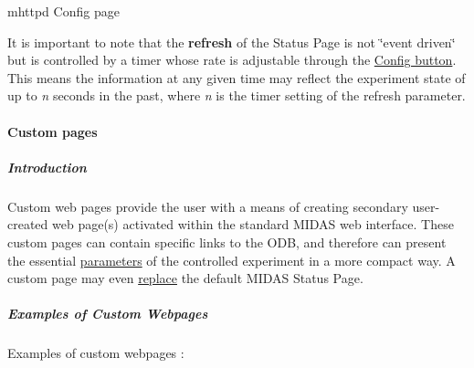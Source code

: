 \begin{center} mhttpd Config page \par
  \end{center} 

It is important to note that the {\bfseries refresh} of the Status Page is not \char`\"{}event driven\char`\"{} but is controlled by a timer whose rate is adjustable through the \hyperlink{RC_mhttpd_status_page_features_RC_mhttpd_Config_button}{Config button}. This means the information at any given time may reflect the experiment state of up to {\itshape  n \/} seconds in the past, where {\itshape  n \/} is the timer setting of the refresh parameter.

\label{index_end}
\hypertarget{index_end}{}
  \paragraph{Custom pages}\label{RC_mhttpd_Custom_page}
\par
  \label{RC_mhttpd_Custom_page_idx_mhttpd_page_custom}
\hypertarget{RC_mhttpd_Custom_page_idx_mhttpd_page_custom}{}
 \label{RC_mhttpd_Custom_page_idx_custom-see-mhttpd-page-custom}
\hypertarget{RC_mhttpd_Custom_page_idx_custom-see-mhttpd-page-custom}{}
 \par
 \par
 \hypertarget{RC_mhttpd_Custom_page_RC_mhttpd_custom_intro}{}\subparagraph{Introduction}\label{RC_mhttpd_Custom_page_RC_mhttpd_custom_intro}
Custom web pages provide the user with a means of creating secondary user-\/created web page(s) activated within the standard MIDAS web interface. These custom pages can contain specific links to the ODB, and therefore can present the essential \hyperlink{structparameters}{parameters} of the controlled experiment in a more compact way. A custom page may even \hyperlink{RC_mhttpd_Activate_RC_odb_custom_status}{replace} the default MIDAS Status Page. \par


\label{RC_mhttpd_Custom_page_idx_mhttpd_page_custom_example-pages}
\hypertarget{RC_mhttpd_Custom_page_idx_mhttpd_page_custom_example-pages}{}
 \hypertarget{RC_mhttpd_Custom_page_RC_Example_Custom_Webpages}{}\subparagraph{Examples of Custom Webpages}\label{RC_mhttpd_Custom_page_RC_Example_Custom_Webpages}
Examples of custom webpages :


